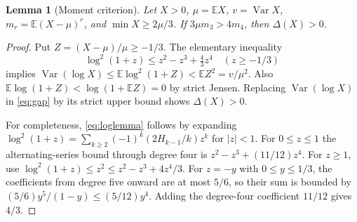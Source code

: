 \documentclass[10pt,letterpaper]{article}
\newtheorem{lemma}{Lemma}
\newcommand{\E}{\mathbb E}
\newcommand{\Var}{\operatorname{Var}}
\begin{document}
\begin{lemma}[Moment criterion]\label{lem:criterion}
Let $X>0$, $\mu=\E X$, $v=\Var X$, $m_r=\E(X-\mu)^r$, and $\min X\ge2\mu/3$. If $3\mu m_3>4m_4$, then $\Delta(X)>0$.
\end{lemma}
\begin{proof}
Put $Z=(X-\mu)/\mu\ge-1/3$. The elementary inequality
\begin{equation}
\log^2(1+z)\le z^2-z^3+\tfrac43z^4\quad(z\ge-1/3)       \label{eq:loglemma}
\end{equation}
implies $\Var(\log X)\le \E\log^2(1+Z)<\E Z^2=v/\mu^2$. Also $\E\log(1+Z)<\log(1+\E Z)=0$ by strict Jensen. Replacing $\Var(\log X)$ in \eqref{eq:gap} by its strict upper bound shows $\Delta(X)>0$.

For completeness, \eqref{eq:loglemma} follows by expanding $\log^2(1+z)=\sum_{k\ge2}(-1)^k(2H_{k-1}/k)z^k$ for $|z|<1$. For $0\le z\le1$ the alternating-series bound through degree four is $z^2-z^3+(11/12)z^4$. For $z\ge1$, use $\log^2(1+z)\le z^2\le z^2-z^3+4z^4/3$. For $z=-y$ with $0\le y\le1/3$, the coefficients from degree five onward are at most $5/6$, so their sum is bounded by $(5/6)y^5/(1-y)\le(5/12)y^4$. Adding the degree-four coefficient $11/12$ gives $4/3$.
\end{proof}
\end{document}
